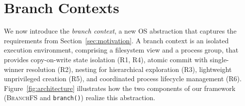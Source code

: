 \documentclass[sigconf]{acmart}
\newcommand{\sys}{\textsc{BranchFS}\xspace}
\newcommand{\syscall}{\texttt{branch()}\xspace}
\begin{document}
\section{Branch Contexts}
\label{sec:branch-contexts}

We now introduce the \emph{branch context}, a new OS abstraction that captures the requirements from Section~\ref{sec:motivation}. A branch context is an isolated execution environment, comprising a filesystem view and a process group, that provides copy-on-write state isolation (R1, R4), atomic commit with single-winner resolution (R2), nesting for hierarchical exploration (R3), lightweight unprivileged creation (R5), and coordinated process lifecycle management (R6). Figure~\ref{fig:architecture} illustrates how the two components of our framework (\sys and \syscall) realize this abstraction.
\end{document}
